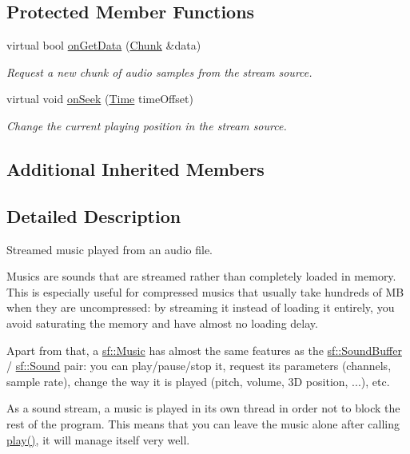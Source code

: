\subsection*{Protected Member Functions}
\begin{DoxyCompactItemize}
\item 
virtual bool \hyperlink{classsf_1_1Music_aca1bcb4e5d56a854133e74bd86374463}{on\-Get\-Data} (\hyperlink{structsf_1_1SoundStream_1_1Chunk}{Chunk} \&data)
\begin{DoxyCompactList}\small\item\em Request a new chunk of audio samples from the stream source. \end{DoxyCompactList}\item 
virtual void \hyperlink{classsf_1_1Music_a15119cc0419c16bb334fa0698699c02e}{on\-Seek} (\hyperlink{classsf_1_1Time}{Time} time\-Offset)
\begin{DoxyCompactList}\small\item\em Change the current playing position in the stream source. \end{DoxyCompactList}\end{DoxyCompactItemize}
\subsection*{Additional Inherited Members}


\subsection{Detailed Description}
Streamed music played from an audio file. 

Musics are sounds that are streamed rather than completely loaded in memory. This is especially useful for compressed musics that usually take hundreds of M\-B when they are uncompressed\-: by streaming it instead of loading it entirely, you avoid saturating the memory and have almost no loading delay.

Apart from that, a \hyperlink{classsf_1_1Music}{sf\-::\-Music} has almost the same features as the \hyperlink{classsf_1_1SoundBuffer}{sf\-::\-Sound\-Buffer} / \hyperlink{classsf_1_1Sound}{sf\-::\-Sound} pair\-: you can play/pause/stop it, request its parameters (channels, sample rate), change the way it is played (pitch, volume, 3\-D position, ...), etc.

As a sound stream, a music is played in its own thread in order not to block the rest of the program. This means that you can leave the music alone after calling \hyperlink{classsf_1_1SoundStream_afdc08b69cab5f243d9324940a85a1144}{play()}, it will manage itself very well.

